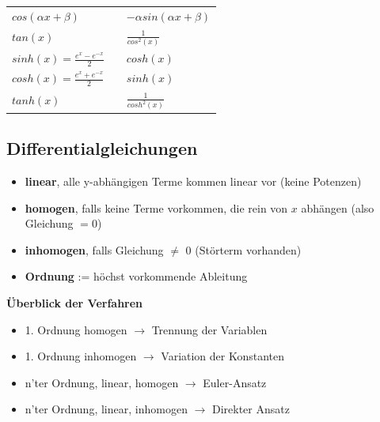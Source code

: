 \documentclass[6pt]{article}
\begin{document}
\begin{multicols*}{3}
\begin{onehalfspace}
\begin{tabular}{ l | l l }
					$cos(\alpha x + \beta)$					&&		$-\alpha sin(\alpha x + \beta)$ 														\\
					$tan(x)$											&&		$\frac{1}{cos^2(x)}$ 																			\\
					$sinh(x) = \frac{e^x - e^{-x}}{2}$		&&		$cosh(x)$ 																						\\
					$cosh(x) = \frac{e^x + e^{-x}}{2}$		&&		$sinh(x)$ 																							\\
					$tanh(x)$											&&		$\frac{1}{cosh^2(x)}$ 																		\\
			\end{tabular}
		\end{onehalfspace}

			
						


\pagebreak
\subsection*{Differentialgleichungen}

	\begin{itemize}[itemsep=2pt, parsep=3pt]
		\item {\bf linear}, alle y-abh{\"a}ngigen Terme kommen linear vor (keine Potenzen)
		\item {\bf homogen}, falls keine Terme vorkommen, die rein von $x$ abh{\"a}ngen (also Gleichung $= 0$)
		\item {\bf inhomogen}, falls Gleichung $\not =$ 0 (St{\"o}rterm vorhanden)
		\item {\bf Ordnung} := h{\"o}chst vorkommende Ableitung
	\end{itemize}
	\vspace{2mm}
	
	{\bf {\"U}berblick der Verfahren} \\
	\vspace{-2mm}
		\begin{itemize}[itemsep=2pt, parsep=3pt]
			\item 1. Ordnung homogen $\rightarrow$ Trennung der Variablen 
			\item 1. Ordnung inhomogen $\rightarrow$ Variation der Konstanten
			\item n'ter Ordnung, linear, homogen $\rightarrow$ Euler-Ansatz	
			\item n'ter Ordnung, linear, inhomogen $\rightarrow$ Direkter Ansatz	 
		\end{itemize}
	

\end{multicols*}
\end{document}
